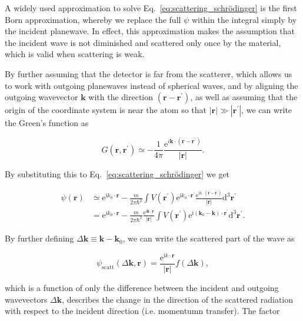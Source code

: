 \documentclass[%
 superscriptaddress,
 aip,
 amsmath,amssymb,
preprint,%
 author-year,%
longbibliography
]{revtex4-2}
\begin{document}
A widely used approximation to solve Eq.~\ref{eq:scattering_schrödinger} is the first Born approximation, whereby we replace the full $\psi$ within the integral simply by the incident planewave. In effect, this approximation makes the assumption that the incident wave is not diminished and scattered only once by the material, which is valid when scattering is weak.

By further assuming that the detector is far from the scatterer, which allows us to work with outgoing planewaves instead of spherical waves, and by aligning the outgoing wavevector $\bm{k}$ with the direction $(\bm{r} - \bm{r^{\prime}})$, as well as assuming that the origin of the coordinate system is near the atom so that $|\bm{r}| \gg |\bm{r^{\prime}}|$, we can write the Green's function as

\begin{equation}
    G\left(\bm{r}, \bm{r}^{\prime}\right) \simeq-\frac{1}{4 \pi} \frac{\mathrm{e}^{i \bm{k} \cdot\left(\bm{r}-\bm{r}^{\prime}\right)}}{|\bm{r}|}.
\end{equation}

By substituting this to Eq.~\ref{eq:scattering_schrödinger} we get

\begin{align}
\psi(\bm{r}) &\simeq \mathrm{e}^{\mathrm{i} k_{0} \cdot \bm{r}}-\frac{m}{2 \pi \hbar^{2}} \int V\left(\bm{r}^{\prime}\right) \mathrm{e}^{\mathrm{i} k_{0} \cdot \bm{r}^{\prime}} \frac{\mathrm{e}^{\mathrm{i} k \cdot\left(\bm{r}-\bm{r}^{\prime}\right)}}{|\bm{r}|} \mathrm{d}^{3} \bm{r}^{\prime}\\
&=\mathrm{e}^{\mathrm{i} k_{0} \cdot \bm{r}}-\frac{m}{2 \pi \hbar^{2}} \frac{\mathrm{e}^{\mathrm{i} \bm{k} \cdot \bm{r}}}{|\bm{r}|} \int V\left(\bm{r}^{\prime}\right) \mathrm{e}^{\mathrm{i}\left(\bm{k}_{0}-\bm{k}\right) \cdot \bm{r}^{\prime}} \mathrm{d}^{3} \bm{r}^{\prime}.
\end{align}

By further defining $\Delta \bm{k} \equiv \bm{k}-\bm{k}_{0}$, we can write the scattered part of the wave as

\begin{equation}
\psi_{\mathrm{scatt}}(\Delta \bm{k}, \bm{r})=\frac{\mathrm{e}^{\mathrm{i} k \cdot \bm{r}}}{|\bm{r}|} f(\Delta \bm{k}),
\end{equation}

which is a function of only the difference between the incident and outgoing wavevectors $\Delta \bm{k}$, describes the change in the direction of the scattered radiation with respect to the incident direction (i.e. momentumn transfer). The factor
\end{document}
